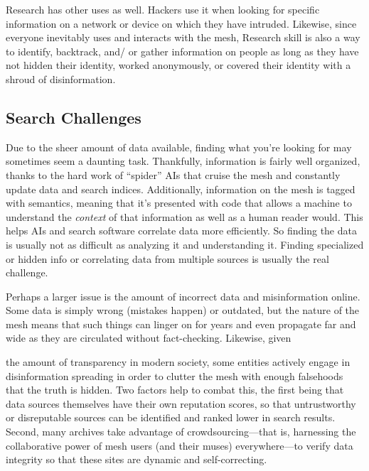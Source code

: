Research has other uses as well. Hackers use it when looking for specific information on a network or device on which they have intruded. Likewise, since everyone inevitably uses and interacts with the mesh, Research skill is also a way to identify, backtrack, and/ or gather information on people as long as they have not hidden their identity, worked anonymously, or covered their identity with a shroud of disinformation. 

\subsection{Search Challenges} 

Due to the sheer amount of data available, finding what you're looking for may sometimes seem a daunting task. Thankfully, information is fairly well organized, thanks to the hard work of ``spider'' AIs that cruise the mesh and constantly update data and search indices. Additionally, information on the mesh is tagged with semantics, meaning that it's presented with code that allows a machine to understand the \textit{context }of that information as well as a human reader would. This helps AIs and search software correlate data more efficiently. So finding the data is usually not as difficult as analyzing it and understanding it. Finding specialized or hidden info or correlating data from multiple sources is usually the real challenge. 

Perhaps a larger issue is the amount of incorrect data and misinformation online. Some data is simply wrong (mistakes happen) or outdated, but the nature of the mesh means that such things can linger on for years and even propagate far and wide as they are circulated without fact-checking. Likewise, given 

the amount of transparency in modern society, some entities actively engage in disinformation spreading in order to clutter the mesh with enough falsehoods that the truth is hidden. Two factors help to combat this, the first being that data sources themselves have their own reputation scores, so that untrustworthy or disreputable sources can be identified and ranked lower in search results. Second, many archives take advantage of crowdsourcing—that is, harnessing the collaborative power of mesh users (and their muses) everywhere—to verify data integrity so that these sites are dynamic and self-correcting. 

